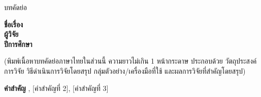 \begin{center}
{\hOneSize บทคัดย่อ}
\end{center}
\vspace{6pt}

\noindent\textbf{ชื่อเรื่อง} \\
\textbf{ผู้วิจัย} \quad [ชื่อ-นามสกุลผู้วิจัย]\\
\textbf{ปีการศึกษา} \quad [พ.ศ. ....]

\vspace{12pt}
\setlength{\parindent}{1.25cm}\indent
(พิมพ์เนื้อหาบทคัดย่อภาษาไทยในส่วนนี้ ความยาวไม่เกิน 1 หน้ากระดาษ ประกอบด้วย
วัตถุประสงค์การวิจัย วิธีดำเนินการวิจัยโดยสรุป กลุ่มตัวอย่าง/เครื่องมือที่ใช้
และผลการวิจัยที่สำคัญโดยสรุป)

\vspace{12pt}
\noindent\textbf{คำสำคัญ} \quad [คำสำคัญที่ 1], [คำสำคัญที่ 2], [คำสำคัญที่ 3]
